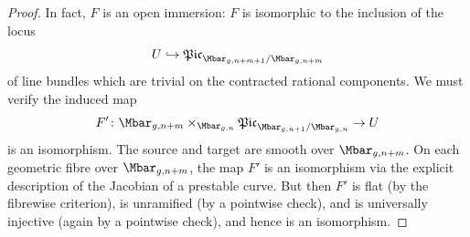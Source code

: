 \documentclass[a4paper,12pt]{article} %
\newcommand{\hra}{\hookrightarrow}
\theoremstyle{definition}
\theoremstyle{plain}%
\newcommand{\Picabs}{\mathfrak{Pic}}
\newcommand{\jocomment}[1]{}
\begin{document}
\begin{proof}
In fact, $F$ is an open immersion: $F$ is isomorphic to the inclusion of the locus $$U \hra \Picabs_{\Mbar_{g,n+m+1}/\Mbar_{g,n+m}}$$ of line bundles which are trivial on the contracted rational components. 
We must verify  the induced map
$$F'\colon \Mbar_{g,n+m} \times_{\Mbar_{g,n}} \Picabs_{\Mbar_{g,n+1}/\Mbar_{g,n}} \to U$$
is an isomorphism. The source and target are smooth over $\Mbar_{g, n + m}$. On each geometric fibre over $\Mbar_{g, n + m}$, the map $F'$ is an isomorphism via the explicit description of the Jacobian of a prestable curve. But then $F'$ is  flat (by the fibrewise criterion), is unramified (by a pointwise check), and is universally injective (again by a pointwise check), and hence is an isomorphism. %
\end{proof}
\end{document}
